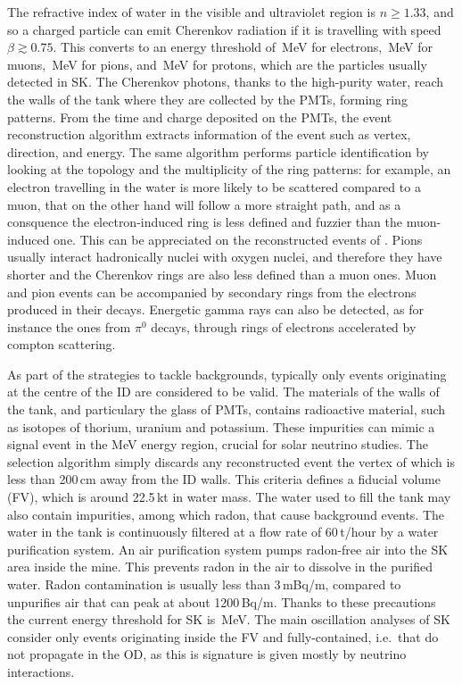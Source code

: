 The refractive index of water in the visible and ultraviolet region is $n \geq 1.33$, %
and so a charged particle can emit Cherenkov radiation if it is travelling %
with speed $\beta \gtrsim 0.75$.
This converts to an energy threshold of \,MeV for electrons, \,MeV for muons, %
\,MeV for pions, and \,MeV for protons, which are the particles usually detected in SK.
The Cherenkov photons, thanks to the high-purity water, reach the walls of the tank where they %
are collected by the PMTs, forming ring patterns.
From the time and charge deposited on the PMTs, the event reconstruction algorithm extracts information of the event %
such as vertex, direction, and energy.
The same algorithm performs particle identification by looking at the topology and the multiplicity of the ring patterns: %
for example, an electron travelling in the water is more likely to be scattered compared to a muon, %
that on the other hand will follow a more straight path, and as a consquence %
the electron-induced ring is less defined and fuzzier than the muon-induced one.
This can be appreciated on the reconstructed events of .
Pions usually interact hadronically nuclei with oxygen nuclei, and therefore they have shorter %
and the Cherenkov rings are also less defined than a muon ones.
Muon and pion events can be accompanied by secondary rings from the electrons produced in their decays.
Energetic gamma rays can also be detected, as for instance the ones from $\pi^0$ decays, %
through rings of electrons accelerated by compton scattering.


As part of the strategies to tackle backgrounds, typically only events originating at the centre %
of the ID are considered to be valid.
The materials of the walls of the tank, and particulary the glass of PMTs, contains radioactive material, %
such as isotopes of thorium, uranium and potassium.
These impurities can mimic a signal event in the MeV energy region, crucial for solar neutrino studies.
The selection algorithm simply discards any reconstructed event the vertex of which is less than 200\,cm away from the ID walls.
This criteria defines a fiducial volume (FV), which is around 22.5\,kt in water mass.
The water used to fill the tank may also contain impurities, among which radon, that cause background events.
The water in the tank is continuously filtered at a flow rate of 60\,t/hour by a water purification system.
An air purification system pumps radon-free air into the SK area inside the mine.
This prevents radon in the air to dissolve in the purified water.
Radon contamination is usually less than 3\,mBq/m, compared to unpurifies air that can peak %
at about 1200\,Bq/m.
Thanks to these precautions the current energy threshold for SK is \,MeV.
The main oscillation analyses of SK consider only events originating inside the FV and fully-contained, %
i.e.\ that do not propagate in the OD, as this is signature is given mostly by neutrino interactions.

